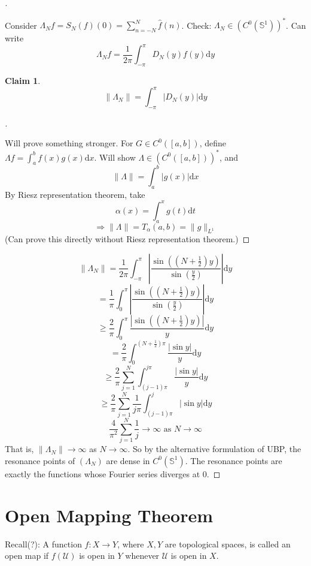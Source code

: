 \documentclass{article}
\theoremstyle{definition}
\newtheorem*{clm}{Claim}
\newenvironment{proofs}[1][\proofname]{%
  \begin{proof}[#1]$ $\par\nobreak\ignorespaces
}{%
  \end{proof}
}
\begin{document}
\begin{proofs}
	Consider $\Lambda_N f = S_N (f)(0) = \sum_{n = -N}^N \hat{f}(n)$.
	Check: $\Lambda_N \in (C^0(\mathbb{S}^1))^*$.
	Can write 
	\[
		\Lambda_N f = \frac{1}{2 \pi} \int_{- \pi}^\pi D_N(y) f(y) \mathrm{d} y
	\]

	\begin{clm}
		\[
			\|\Lambda_N\| = \int_{- \pi}^\pi |D_N(y)| \mathrm{d} y
		\]
	\end{clm}

	\begin{proofs}
		Will prove something stronger.
		For $G \in C^0([a, b])$, define $\Lambda f = \int_a^b f(x) g(x) \mathrm{d} x$.
		Will show $\Lambda \in (C^0([a, b]))^*$, and
		\[
			\| \Lambda \| = \int_a^b |g(x)| \mathrm{d} x
		\]
		By Riesz representation theorem, take 
		\[
			\alpha (x) = \int_a^x g(t) \mathrm{d} t
		\]
		\[
			\Rightarrow \|\Lambda \| = T_\alpha(a, b) = \|g\|_{L^1}
		\]
		(Can prove this directly without Riesz representation theorem.)
	\end{proofs}
	\[
		\|\Lambda_N\| = \frac{1}{2 \pi} \int_{- \pi}^\pi \left| \frac{\sin \left( \left( N + \frac{1}{2} \right) y \right)}{\sin \left( \frac{y}{2} \right)} \right| \mathrm{d} y
	\]
	\[
		= \frac{1}{\pi} \int_0^\pi \left| \frac{\sin \left( \left( N + \frac{1}{2} \right) y \right) } {\sin \left( \frac{y}{2} \right)} \right| \mathrm{d} y
	\]
	\[
		\geq \frac{2}{\pi} \int_0^\pi \frac{\left| \sin \left( \left( N + \frac{1}{2} \right) y \right) \right|}{y} \mathrm{d} y
	\]
	\[
		= \frac{2}{\pi} \int_0^{\left( N + \frac{1}{2} \right) \pi} \frac{|\sin y|}{y} \mathrm{d} y
	\]
	\[
		\geq \frac{2}{\pi} \sum_{j = 1}^N \int_{(j - 1) \pi}^{j \pi} \frac{|\sin y|}{y} \mathrm{d} y
	\]
	\[
		\geq \frac{2}{\pi} \sum_{j = 1}^N \frac{1}{j \pi} \int_{(j - 1) \pi}^j |\sin y| \mathrm{d} y
	\]
	\[
		\frac{4}{\pi^2} \sum_{j = 1}^N \frac{1}{j} \to \infty \text{ as } N \to \infty
	\]
	That is, $\|\Lambda_N \| \to \infty$ as $N \to \infty$.
	So by the alternative formulation of UBP, the resonance points of $(\Lambda_N)$ are dense in $C^0(\mathbb{S}^1)$.
	The resonance points are exactly the functions whose Fourier series diverges at 0.
\end{proofs}

\section{Open Mapping Theorem}

Recall(?): A function $f: X \to Y$, where $X, Y$ are topological spaces, is called an open map if $f(\mathcal{U})$ is open in $Y$ whenever $\mathcal{U}$ is open in $X$.
\end{document}

